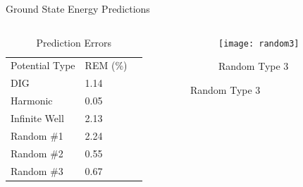 \documentclass{beamer}
\begin{document}
\begin{frame}{Ground State Energy Predictions}
\begin{columns}
    \begin{column}{0.4\textwidth}
        \begin{table}[]
            \centering
            \caption{Prediction Errors}
            \begin{tabular}{lll}
            Potential Type & REM (\%) \\
            DIG            & 1.14     \\
            Harmonic       & 0.05     \\
            Infinite Well  & 2.13     \\
            Random \#1     & 2.24     \\
            Random \#2     & 0.55     \\
            Random \#3     & 0.67                    
            \end{tabular} 
        \end{table}
    \end{column}
    \begin{column}{0.8\textwidth}
    \graphicspath{{"../figs/training/"}}
    \begin{figure}[H]
        \begin{subfigure}[t]{0.80\textwidth}
            \texttt{[image: random3]}
        \caption{Random Type 3}
        \end{subfigure}
    \end{figure}
    \end{column}
\end{columns}
\end{frame}
\end{document}

